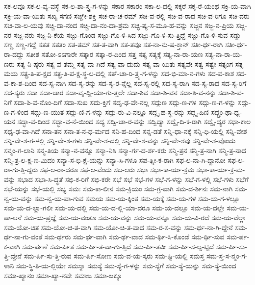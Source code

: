 {ಸಕ-ಲವೂ
ಸಕ-ಲ-ವ್ಯ-ವಸ್ಥೆ
ಸಕ-ಲ-ಶಾ-ಸ್ತ್ರ-ಗ-ಳನ್ನು
ಸಕಾರ
ಸಕಾರಂ
ಸಕಾ-ಲ-ದಲ್ಲಿ
ಸಕ್ಕರೆ
ಸಕ್ಕ-ರೆ-ಯಂಥ
ಸಕ್ರಿ-ಯ-ವಾಗಿ
ಸಕ್ರಿ-ಯ-ವಾ-ಯಿತು
ಸಖ್ಯ
ಸಗಣಿ
ಸಙ್ಘೇ-ಶಕ್ತಿ
ಸಚ-ರಾ-ಚ-ರಮ್
ಸಚಿ-ವ-ರಲ್ಲಿ
ಸಚಿ-ವ-ರಾದ
ಸಚಿ-ವ-ರಿಗೂ
ಸಚಿ-ವರು
ಸಚಿ-ವಾ-ಲ-ಯವು
ಸಚ್ಚಿ-ದಾ-ನಂದ
ಸಚ್ಚಿ-ದಾ-ನಂ-ದಾ-ಶ್ರಮ
ಸಚ್ಛಿ-ಷ್ಯ-ಸ-ಮೂ-ಹ-ವನ್ನು
ಸಜ್ಜನ
ಸಜ್ಜ-ನ-ಪ್ರಿಯ
ಸಜ್ಜ-ನರ
ಸಜ್ಜ-ನರು
ಸಜ್ಜ-ನಿ-ಕೆಯ
ಸಜ್ಜು-ಗೊಂಡ
ಸಜ್ಜು-ಗೊ-ಳಿ-ಸಿದ
ಸಜ್ಜು-ಗೊ-ಳಿ-ಸು-ತ್ತಿದ್ದೆ
ಸಜ್ಜು-ಗೊ-ಳಿ-ಸುವ
ಸಡ್ಡು
ಸಣ್ಣ
ಸಣ್ಣ-ಗದ್ದೆ
ಸತತ
ಸತತಂ
ಸತ-ತಮ್
ಸತ-ತ-ವಾಗಿ
ಸತ-ತವೂ
ಸತ-ನಾ-ನು-ಷ-ಕ್ತಾನ್
ಸತೀ-ರ್ಥ-ರಾಗಿ
ಸತೀ-ರ್ಥ-ರಾ-ದದ್ದು
ಸತೀಶ
ಸತೋ-ಽಽಗಾರೇ
ಸತ್ಕಾರ
ಸತ್ಕಾ-ರ-ದಿಂದ
ಸತ್ತ
ಸತ್ಯ
ಸತ್ಯಕ್ಕೆ
ಸತ್ಯ-ನಾ-ರಾ-ಯಣ
ಸತ್ಯ-ನಾ-ರಾ-ಯ-ಣರು
ಸತ್ಯ-ನಿ-ಷ್ಠರು
ಸತ್ಯ-ವ-ತಮ್ಮ
ಸತ್ಯ-ವಾ-ಗಿದೆ
ಸತ್ಯ-ವಾ-ದುದು
ಸತ್ಯ-ವಾ-ಯಿತು
ಸತ್ಯವೇ
ಸತ್ವ
ಸತ್ವೇ
ಸತ್ಸಂಗ
ಸತ್ಸ-ಮಯ
ಸತ್ಪ್ರ-ತಿ-ಪ-ಕ್ಷದ
ಸತ್ಪ್ರ-ತಿ-ಪ-ಕ್ಷ-ಸ್ಥ-ಲ-ದಲ್ಲಿ
ಸತ್-ಚಾ-ರಿ-ತ್ರ್ಯ-ಗ-ಳನ್ನು
ಸದ-ಭಿ-ಮಾ-ನ-ಗಳು
ಸದ-ವ-ಕಾಶ
ಸದ-ವ-ಕಾ-ಶ-ದಿಂದ
ಸದ-ಸ್ಯ-ನಾಗಿ
ಸದ-ಸ್ಯ-ರನ್ನು
ಸದ-ಸ್ಯ-ರ-ನ್ನೆಲ್ಲ
ಸದ-ಸ್ಯ-ರಲ್ಲಿ
ಸದ-ಸ್ಯ-ರಾಗಿ
ಸದ-ಸ್ಯ-ರಾದ
ಸದ-ಸ್ಯ-ರಿಗೆ
ಸದ-ಸ್ಯರು
ಸದಾ
ಸದಾ-ಚಾರ
ಸದಾ-ವೃ-ದ್ದಿ-ಯಾ-ಗು-ತ್ತಲೇ
ಸದಾ-ಶಿವ
ಸದಾ-ಶಿ-ವನ
ಸದಾ-ಶಿ-ವ-ನನ್ನು
ಸದಾ-ಶಿ-ವ-ನಿಗೆ
ಸದಾ-ಶಿ-ವ-ನೊಂ-ದಿಗೆ
ಸದಾ-ಸುಖ
ಸದು-ಕ್ತಿಗೆ
ಸದೃ-ಢ-ವೇ-ನಲ್ಲ
ಸದ್ಗುಣ
ಸದ್ಗು-ಣ-ಗಳ
ಸದ್ಗು-ಣ-ಗ-ಳನ್ನು
ಸದ್ಗು-ಣ-ಗ-ಳಿಂದ
ಸದ್ಗು-ಣ-ಯುತ
ಸದ್ಗು-ಣಿ-ಗ-ಳನ್ನು
ಸದ್ಗು-ರು-ವಿ-ನಲ್ಲೂ
ಸದ್ಗೃ-ಹ-ಸ್ಥ-ರನ್ನು
ಸದ್ಗೃ-ಹಿಣಿ
ಸದ್ಗ್ರಂ-ಥಾ-ಧ್ಯ-ಯನ
ಸದ್ಭಾ-ವ-ದಿಂದ
ಸದ್ಭಾ-ವ-ನೆ-ಯಿಂದ
ಸದ್ಯ
ಸದ್ವಿ-ಚಾ-ರ-ವನ್ನು
ಸದ್ವಿದ್ಯಾ
ಸದ್ವೈ-ದಿ-ಕ-ರಾಗಿ
ಸದ್ವೈ-ದ್ಯರ
ಸಧಾ-ಕಾಲ
ಸಧೃ-ಢ-ವಾ-ಗಿದೆ
ಸನಾ-ತನ
ಸನಾ-ತ-ನ-ಧ-ರ್ಮದ
ಸನಿ-ಹ-ದಿಂದ
ಸನ್ನ-ಡತೆ
ಸನ್ನಿ-ಧಾ-ನಕ್ಕೆ
ಸನ್ನಿ-ಧಿ-ಯಲ್ಲಿ
ಸನ್ನಿ-ವೇಶ
ಸನ್ನಿ-ವೇ-ಶ-ಗ-ಳಲ್ಲಿ
ಸನ್ನಿ-ವೇ-ಶ-ಗಳು
ಸನ್ನಿ-ವೇ-ಶ-ದಲ್ಲಿ
ಸನ್ನಿ-ವೇ-ಶ-ವನ್ನು
ಸನ್ನಿ-ವೇ-ಶವು
ಸನ್ನಿ-ವೇ-ಶ-ವೊಂದು
ಸನ್ಮಂ-ಗ-ಲಾನಿ
ಸನ್ಮ-ತಿಯ
ಸನ್ಮಾ-ನ-ವನ್ನೂ
ಸನ್ಮಾ-ನಿಸಿ
ಸನ್ಮಾ-ರ್ಗ-ದ-ರ್ಶ-ಕರು
ಸನ್ಮಿ-ತ್ರನ
ಸನ್ಮಿ-ತ್ರ-ನಾಗಿ
ಸನ್ಮಿ-ತ್ರ-ನಾದ
ಸನ್ಮಿ-ತ್ರ-ಲ-ಕ್ಷ-ಣ-ಮಿದಂ
ಸನ್ಯಾ-ಸ-ಭಿ-ಕ್ಷೆ-ಯನ್ನು
ಸನ್ಯಾ-ಸಿ-ಗಳೂ
ಸಪ-ತ್ನೀ-ಕ-ರಾಗಿ
ಸಫ-ಲ-ನಾ-ಗಿ-ದ್ದಾನೋ
ಸಫ-ಲ-ರಾ-ಗು-ತ್ತಿ-ದ್ದರು
ಸಫ-ಲ-ರಾ-ದರೂ
ಸಫ-ಲ-ವೆಂದು
ಸಬ-ಲರು
ಸಭಾ
ಸಭಾ-ಕಾ-ರ್ಯ-ಕ್ರಮ
ಸಭಾ-ಕಾ-ರ್ಯ-ಕ್ರ-ಮ-ವನ್ನು
ಸಭಾದ
ಸಭಾ-ಸಿ-ದ್ಧತೆ
ಸಭಿ-ಕ-ರಿಗೆ
ಸಭಿ-ಕರೇ
ಸಭೆ
ಸಭೆ
ಸಭೆ-ಗಳ
ಸಭೆ-ಗ-ಳನ್ನು
ಸಭೆ-ಗ-ಳಲ್ಲಿ
ಸಭೆ-ಗಳು
ಸಭೆಗೆ
ಸಭೆ-ಯನ್ನು
ಸಭೆ-ಯಲ್ಲಿ
ಸಭ್ಯ
ಸಮಃ
ಸಮ-ಕಾ-ಲೀನ
ಸಮ-ಕ್ರಿಯಂ
ಸಮ-ಗ್ರ-ವಾಗಿ
ಸಮ-ದ-ರ್ಶಿನಃ
ಸಮ-ನಾಗಿ
ಸಮ-ನ್ವ-ಯ-ವನ್ನು
ಸಮ-ನ್ವ-ಯ-ವಾ-ಗುವ
ಸಮಯ
ಸಮ-ಯ-ಕ್ಕಿಂತ
ಸಮ-ಯಕ್ಕೆ
ಸಮ-ಯ-ಗಳ
ಸಮ-ಯ-ಗ-ಳಲ್ಲೂ
ಸಮ-ಯ-ದ-ಲ್ಲಾ-ಗಲೀ
ಸಮ-ಯ-ದಲ್ಲಿ
ಸಮ-ಯ-ದ-ಲ್ಲಿ-ಯಾ-ದರೂ
ಸಮ-ಯ-ದಲ್ಲೂ
ಸಮ-ಯ-ದಲ್ಲೇ
ಸಮ-ಯ-ಪಾ-ಲನೆ
ಸಮ-ಯ-ಪ್ರಜ್ಞೆ
ಸಮ-ಯ-ವಂತೂ
ಸಮ-ಯ-ವನ್ನು
ಸಮ-ಯ-ವನ್ನೂ
ಸಮ-ಯ-ವಿ-ರದೆ
ಸಮ-ಯ-ವೆಲ್ಲಾ
ಸಮ-ಯೋ-ಚಿತ
ಸಮ-ಯೋ-ಚಿ-ತ-ವಾಗಿ
ಸಮ-ಯೋ-ಚಿ-ತ-ವಾದ
ಸಮ-ರ-ಸ-ವನ್ನು
ಸಮ-ರ್ಥ-ನಾ-ಗಿ-ದ್ದೇನೆ
ಸಮ-ರ್ಥ-ನಾ-ಗು-ವಂತೆ
ಸಮ-ರ್ಥರು
ಸಮ-ರ್ಥ-ವಾಗಿ
ಸಮ-ರ್ಥ-ವಾದ
ಸಮ-ರ್ಥಿ-ಸಿ-ಕೊಂಡೆ
ಸಮ-ರ್ಥಿ-ಸುವ
ಸಮ-ರ್ಪ-ಕ-ವಾಗಿ
ಸಮ-ರ್ಪಣೆ
ಸಮ-ರ್ಪಿತ
ಸಮ-ರ್ಪಿ-ತ-ವಾ-ಗು-ತ್ತಿದೆ
ಸಮ-ರ್ಪಿ-ತವೀ
ಸಮ-ರ್ಪಿ-ಸ-ಲ್ಪ-ಟ್ಟಿದೆ
ಸಮ-ರ್ಪಿ-ಸು-ತ್ತಿ-ದ್ದೇನೆ
ಸಮ-ರ್ಪಿ-ಸು-ತ್ತಿ-ರುವ
ಸಮ-ರ್ಪಿ-ಸೋಣ
ಸಮ-ವ-ಯ-ಸ್ಕರು
ಸಮ-ಷ್ಟಿ-ಯಲ್ಲಿ
ಸಮಸ್ತ
ಸಮ-ಸ್ತ-ಸ-ನ್ಮಂ-ಗ-ಳಾನಿ
ಸಮ-ಸ್ಥಿ-ತಿ-ಯ-ಲ್ಲಿಯೇ
ಸಮಸ್ಯಾ
ಸಮಸ್ಯೆ
ಸಮ-ಸ್ಯೆ-ಗ-ಳನ್ನು
ಸಮ-ಸ್ಯೆಗೆ
ಸಮ-ಸ್ಯೆ-ಯನ್ನು
ಸಮ-ಸ್ಯೆ-ಯಿಂದ
ಸಮಾ-ಖ್ಯಾನಂ
ಸಮಾ-ಖ್ಯಾ-ನವೇ
ಸಮಾಜ
ಸಮಾ-ಜಕ್ಕೂ
}
